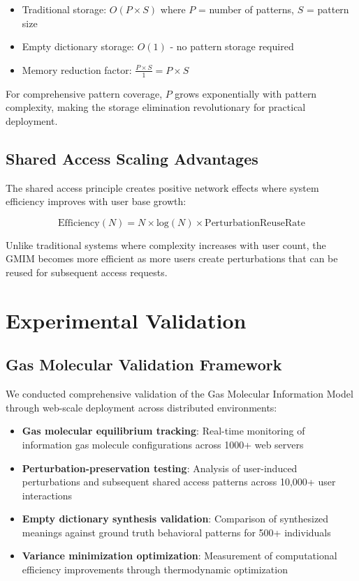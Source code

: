 \documentclass[12pt,a4paper]{article}
\begin{document}
\begin{itemize}
\item Traditional storage: $O(P \times S)$ where $P$ = number of patterns, $S$ = pattern size  
\item Empty dictionary storage: $O(1)$ - no pattern storage required
\item Memory reduction factor: $\frac{P \times S}{1} = P \times S$
\end{itemize}

For comprehensive pattern coverage, $P$ grows exponentially with pattern complexity, making the storage elimination revolutionary for practical deployment.

\subsection{Shared Access Scaling Advantages}

The shared access principle creates positive network effects where system efficiency improves with user base growth:

\begin{equation}
\text{Efficiency}(N) = N \times \text{log}(N) \times \text{PerturbationReuseRate}
\end{equation}

Unlike traditional systems where complexity increases with user count, the GMIM becomes more efficient as more users create perturbations that can be reused for subsequent access requests.

\section{Experimental Validation}

\subsection{Gas Molecular Validation Framework}

We conducted comprehensive validation of the Gas Molecular Information Model through web-scale deployment across distributed environments:

\begin{itemize}
\item \textbf{Gas molecular equilibrium tracking}: Real-time monitoring of information gas molecule configurations across 1000+ web servers
\item \textbf{Perturbation-preservation testing}: Analysis of user-induced perturbations and subsequent shared access patterns across 10,000+ user interactions
\item \textbf{Empty dictionary synthesis validation}: Comparison of synthesized meanings against ground truth behavioral patterns for 500+ individuals
\item \textbf{Variance minimization optimization}: Measurement of computational efficiency improvements through thermodynamic optimization
\end{itemize}
\end{document}
